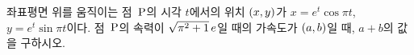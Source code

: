 좌표평면 위를 움직이는 점~$\mathrm{P}$의 시각 $t$에서의 위치 $(x{,}\mkern3mu\mathopen{}y)$가 $x=e^t\cos\pi t$, $y=e^t\sin\pi t$이다. 점~$\mathrm{P}$의 속력이 $\sqrt{\pi^2+1}\mkern3mu e$일 때의 가속도가 $(a{,}\mkern3mu\mathopen{}b)$일 때, $a+b$의 값을 구하시오.
